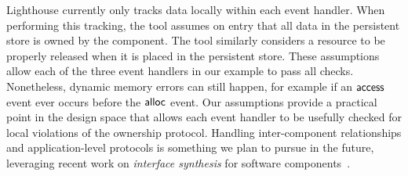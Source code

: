Lighthouse currently only tracks data locally within each
event handler.  
%
When performing this tracking, the tool assumes on entry that all data
in the persistent store is owned by the component.
%
The tool similarly considers a resource to be properly released when
it is placed in the persistent store.  
%
These assumptions allow each of the three event handlers in our
example to pass all checks.  Nonetheless, dynamic memory errors can still happen, 
for example if an ${\mathsf{access}}$ event
ever occurs before the ${\mathsf{alloc}}$ event.  
%
Our assumptions provide a practical point in the design space
that allows each event handler to be usefully checked for local
violations of the ownership protocol.  
%
Handling inter-component relationships and application-level
protocols is something we plan to pursue in the future, leveraging
recent work on {\em interface synthesis} 
for software components~\cite{AlurPOPL05,HJM05}.

